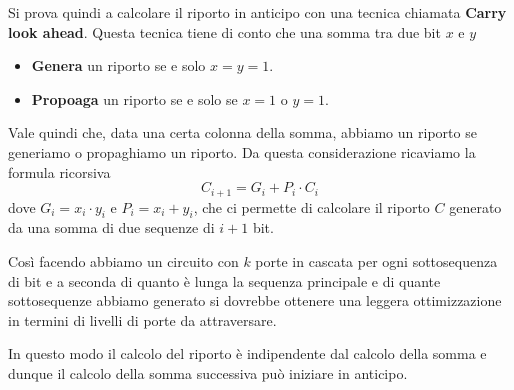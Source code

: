 Si prova quindi a calcolare il riporto in anticipo con una tecnica chiamata \textbf{Carry look ahead}.
Questa tecnica tiene di conto che una somma tra due bit $x$ e $y$
\begin{itemize}
	\item \textbf{Genera} un riporto se e solo $x = y = 1$.
	\item \textbf{Propoaga} un riporto se e solo se $x = 1$ o $y = 1$.
\end{itemize}
Vale quindi che, data una certa colonna della somma, abbiamo un riporto se generiamo o propaghiamo
un riporto. Da questa considerazione ricaviamo la formula ricorsiva
\[ C_{i+1} = G_i + P_i \cdot C_i \]
dove $G_i = x_i \cdot y_i$ e $P_i = x_i + y_i$, che ci permette di calcolare il riporto $C$
generato da una somma di due sequenze di $i+1$ bit.

Così facendo abbiamo un circuito con $k$ porte in cascata per ogni sottosequenza di bit e a seconda
di quanto è lunga la sequenza principale e di quante sottosequenze abbiamo generato si dovrebbe
ottenere una leggera ottimizzazione in termini di livelli di porte da attraversare.

In questo modo il calcolo del riporto è indipendente dal calcolo della somma e dunque il calcolo
della somma successiva può iniziare in anticipo.

